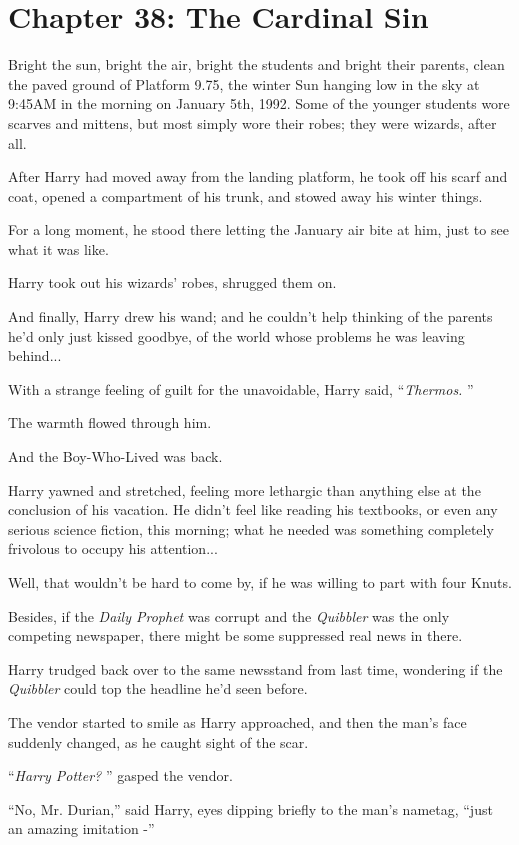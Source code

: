 \chapter{Chapter 38: The Cardinal Sin}
Bright the sun, bright the air, bright the students and bright their
parents, clean the paved ground of Platform 9.75, the winter Sun hanging
low in the sky at 9:45AM in the morning on January 5th, 1992. Some of
the younger students wore scarves and mittens, but most simply wore
their robes; they were wizards, after all.

After Harry had moved away from the landing platform, he took off his
scarf and coat, opened a compartment of his trunk, and stowed away his
winter things.

For a long moment, he stood there letting the January air bite at him,
just to see what it was like.

Harry took out his wizards' robes, shrugged them on.

And finally, Harry drew his wand; and he couldn't help thinking of the
parents he'd only just kissed goodbye, of the world whose problems he
was leaving behind...

With a strange feeling of guilt for the unavoidable, Harry said,
``\emph{Thermos.} ''

The warmth flowed through him.

And the Boy-Who-Lived was back.

Harry yawned and stretched, feeling more lethargic than anything else at
the conclusion of his vacation. He didn't feel like reading his
textbooks, or even any serious science fiction, this morning; what he
needed was something completely frivolous to occupy his
attention...

Well, that wouldn't be hard to come by, if he was willing to part with
four Knuts.

Besides, if the \emph{Daily Prophet} was corrupt and the \emph{Quibbler}
was the only competing newspaper, there might be some suppressed real
news in there.

Harry trudged back over to the same newsstand from last time, wondering
if the \emph{Quibbler} could top the headline he'd seen before.

The vendor started to smile as Harry approached, and then the man's face
suddenly changed, as he caught sight of the scar.

``\emph{Harry Potter?} '' gasped the vendor.

``No, Mr. Durian,'' said Harry, eyes dipping briefly to the man's
nametag, ``just an amazing imitation -''

